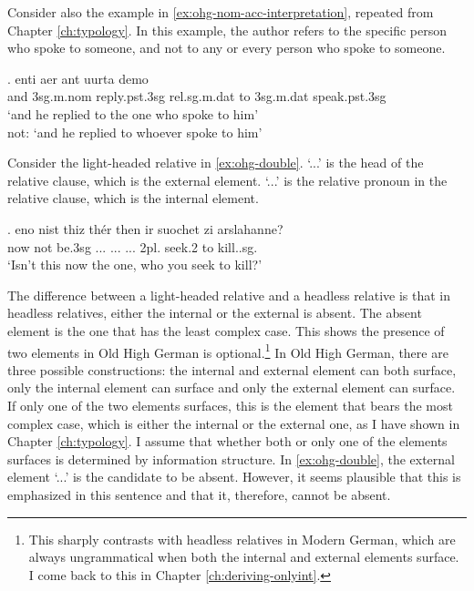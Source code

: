 Consider also the example in \ref{ex:ohg-nom-acc-interpretation}, repeated from Chapter \ref{ch:typology}.
In this example, the author refers to the specific person who spoke to someone, and not to any or every person who spoke to someone.

\exg. enti aer {ant uurta} demo  \\
and 3\ac{sg}.\ac{m}.\ac{nom} reply.\ac{pst}.3\ac{sg}\scsub{[dat]} \ac{rel}.\ac{sg}.\ac{m}.\ac{dat} {to 3\ac{sg}.\ac{m}.\ac{dat}} speak.\ac{pst}.3\ac{sg}\scsub{[nom]}\\
`and he replied to the one who spoke to him'\\
not: `and he replied to whoever spoke to him'
 \label{ex:ohg-dat-nom-rep}

 Consider the light-headed relative in \ref{ex:ohg-double}.  `...' is the head of the relative clause, which is the external element.  `...' is the relative pronoun in the relative clause, which is the internal element.

 \exg. eno nist thiz thér then ir suochet zi arslahanne?\\
  now {not be.3\ac{sg}} ... ...
  ... 2\ac{pl}. seek.2 to kill..\ac{sg}.\\
  `Isn't this now the one, who you seek to kill?'\label{ex:ohg-double}

 The difference between a light-headed relative and a headless relative is that in headless relatives, either the internal or the external is absent. The absent element is the one that has the least complex case. This shows the presence of two elements in Old High German is optional.\footnote{
 This sharply contrasts with headless relatives in Modern German, which are always ungrammatical when both the internal and external elements surface. I come back to this in Chapter \ref{ch:deriving-onlyint}.
 }
 In Old High German, there are three possible constructions: the internal and external element can both surface, only the internal element can surface and only the external element can surface. If only one of the two elements surfaces, this is the element that bears the most complex case, which is either the internal or the external one, as I have shown in Chapter \ref{ch:typology}. I assume that whether both or only one of the elements surfaces is determined by information structure. In \ref{ex:ohg-double}, the external element  `...' is the candidate to be absent. However, it seems plausible that this is emphasized in this sentence and that it, therefore, cannot be absent.


